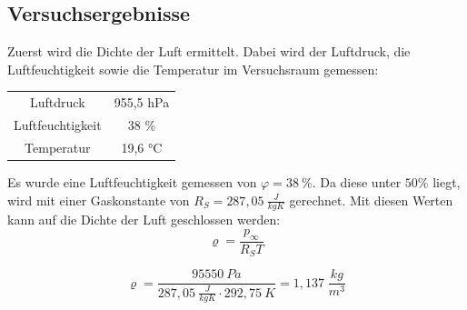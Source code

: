 \documentclass[pdfpaper,openbib, twoside, titlepage, halfparskip-,a4paper, 10pt]{scrarticle}
\begin{document}
\subsection{Versuchsergebnisse}
Zuerst wird die Dichte der Luft ermittelt. Dabei wird der Luftdruck, die Luftfeuchtigkeit sowie die Temperatur im Versuchsraum gemessen:
\begin{table}[H]
    \centering
\begin{tabular}{c|c}
    Luftdruck & 955,5 hPa\\
    Luftfeuchtigkeit & 38 \% \\
    Temperatur & 19,6 °C
\end{tabular}
\end{table}
Es wurde eine Luftfeuchtigkeit gemessen von $\varphi = 38 \ \%$. Da diese unter $50 \%$ liegt, wird mit einer Gaskonstante von $R_S = 287,05 \ \frac{J}{kgK}$ gerechnet. 
Mit diesen Werten kann auf die Dichte der Luft geschlossen werden:
\begin{equation}
    \varrho = \frac{p_\infty}{R_S T}
\end{equation}

\begin{equation*}
    \varrho = \frac{95550 \ Pa}{287,05 \ \frac{J}{kgK} \cdot 292,75 \ K} = 1,137 \;\frac{kg}{m^3}
\end{equation*}
\end{document}
